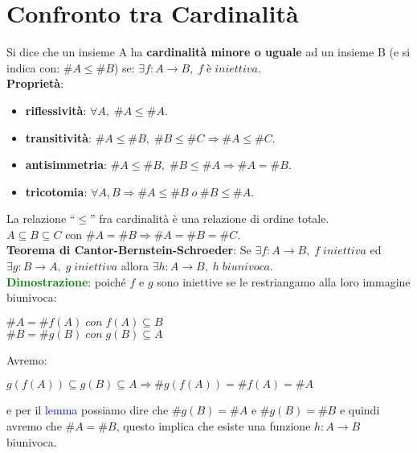 \section{Confronto tra Cardinalità}
Si dice che un insieme A ha \textbf{cardinalità minore o uguale} ad un insieme B (e si indica con: $\#A \leq \#B$) se: $\exists f : A \rightarrow B, \; f \; è \; iniettiva$. \\
\textbf{Proprietà}:
\begin{itemize}
    \item \textbf{riflessività}: $\forall A, \; \#A \leq \#A$.
    \item \textbf{transitività}: $\#A \leq \#B, \; \#B \leq \#C \Rightarrow \#A \leq \#C$.
    \item \textbf{antisimmetria}: $\#A \leq \#B, \; \#B \leq \#A \Rightarrow \#A = \#B$.
    \item \textbf{tricotomia}: $\forall A, B \Rightarrow \#A \leq \#B \; o \; \#B \leq \#A$.
\end{itemize}
La relazione ``$\leq$'' fra cardinalità è una relazione di ordine totale. \\
$A \subseteq B \subseteq C$ con $\#A = \#B \Rightarrow \#A = \#B = \#C$. \\
\newline
\textbf{Teorema di Cantor-Bernstein-Schroeder}: Se $\exists f : A \rightarrow B, \; f \; iniettiva$ ed $\exists g : B \rightarrow A, \; g \; iniettiva$ allora $\exists h : A \rightarrow B, \; h \; biunivoca$. \\
\textcolor{green}{\textbf{Dimostrazione}}: poiché $f$ e $g$ sono iniettive se le restriangamo alla loro immagine biunivoca:
\begin{center}
    $\#A = \#f(A) \; con \; f(A) \subseteq B$ \\
    $\#B = \#g(B) \; con \; g(B) \subseteq A$ \\
\end{center}
Avremo:
\begin{center}
    $g(f(A)) \subseteq g(B) \subseteq A \Rightarrow \#g(f(A)) = \#f(A) = \#A$
\end{center}
e per il \textcolor{blue}{lemma} possiamo dire che $\#g(B) = \#A$ e $\#g(B) = \#B$ e quindi avremo che $\#A = \#B$, questo implica che esiste una funzione $h : A \rightarrow B$ biunivoca.

